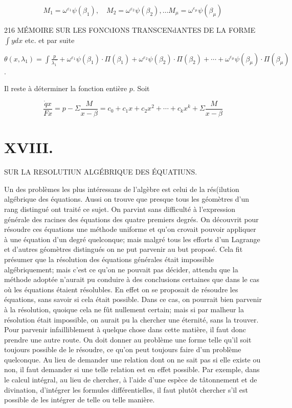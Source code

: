 \documentclass{article}
\begin{document}
\[
M_{1}=\omega^{\varepsilon_{1}} \psi\left(\beta_{1}\right), \quad M_{2}=\omega^{\varepsilon_{2}} \psi\left(\beta_{2}\right), \ldots M_{\mu}=\omega^{\varepsilon_{\mu}} \psi\left(\beta_{\mu}\right)
\]

216 MÉMOIRE SUR LES FONCtIONS TRANSCENdANTES DE LA FORME \(\int y d x\) etc. et par suite

\(\theta\left(x, \lambda_{1}\right)=\int \frac{p}{\bar{\lambda}_{1}^{-}}+\omega^{\varepsilon_{1}} \psi\left(\beta_{1}\right) \cdot \Pi\left(\beta_{1}\right)+\omega^{\varepsilon_{2}} \psi\left(\beta_{2}\right) \cdot \Pi\left(\beta_{2}\right)+\cdots+\omega^{\varepsilon_{\mu}} \psi\left(\beta_{\mu}\right) \cdot \Pi\left(\beta_{\mu}\right)\).

Il reste à déterminer la fonction entière \(p\). Soit

\[
\frac{\dot{q} x}{F x}=p-\Sigma \frac{M}{x-\beta}=c_{0}+c_{1} x+c_{2} x^{2}+\cdots+c_{k} x^{k}+\Sigma \frac{M}{x-\beta}
\]

\section*{XVIII.}

SUR LA RESOLUTIUN ALGÉBRIQUE DES ÉQUATIUNS.

Un des problèmes les plus intéressans de l'algèbre est celui de la rés(ilution algébrique des équations. Aussi on trouve que presque tous les géomètres d'un rang distingué ont traité ce sujet. On parvint sans difficulté à l'expression générale des racines des équations des quatre premiers degrés. On découvrit pour résoudre ces équations une méthode uniforme et qu'on crovait pouvoir appliquer à une équation d'un degré quelconque; mais malgré tous les efforts d'un Lagrange et d'autres géomètres distingués on ne put parvenir au but proposé. Cela fit présumer que la résolution des équations générales était impossible algébriquement; mais c'est ce qu'on ne pouvait pas décider, attendu que la méthode adoptée n'aurait pu conduire à des conclusions certaines que dans le cas où les équations étaient résolubles. En effet on se proposait de résoudre les équations, sans savoir si cela était possible. Dans ce cas, on pourrait bien parvenir à la résolution, quoique cela ne fût nullement certain; mais si par malheur la résolution était impossible, on aurait pu la chercher une éternité, sans la trouver. Pour parvenir infailliblement à quelque chose dans cette matière, il faut donc prendre une autre route. On doit donner au problème une forme telle qu'il soit toujours possible de le résoudre, ce qu'on peut toujours faire d'un problème quelconque. Au lieu de demander une relation dont on ne sait pas si elle existe ou non, il faut demander si une telle relation est en effet possible. Par exemple, dans le calcul intégral, au lieu de chercher, à l'aide d'une espèce de tâtonnement et de divination, d'intégrer les formules différentielles, il faut plutôt chercher s'il est possible de les intégrer de telle ou telle manière.
\end{document}
